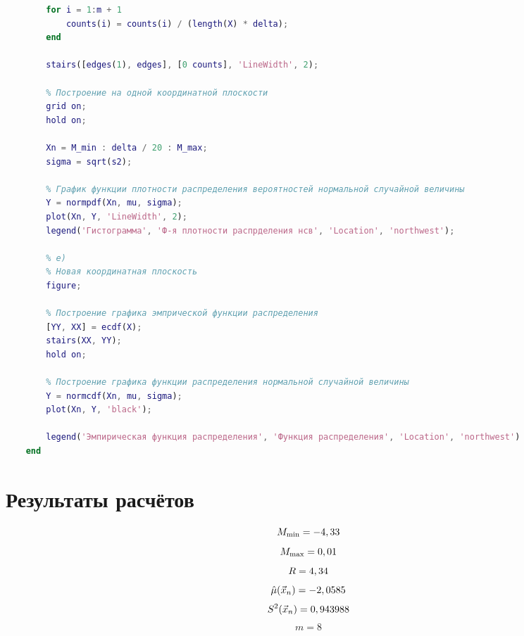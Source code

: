 \documentclass[12pt]{report}
\begin{document}
\begin{lstlisting}[language=Matlab]
		% д) Построение гистограммы
		for i = 1:m + 1
			counts(i) = counts(i) / (length(X) * delta);
		end
	
		stairs([edges(1), edges], [0 counts], 'LineWidth', 2);
	
		% Построение на одной координатной плоскости
		grid on;
		hold on;
	
		Xn = M_min : delta / 20 : M_max;
		sigma = sqrt(s2);
	
		% График функции плотности распределения вероятностей нормальной случайной величины
		Y = normpdf(Xn, mu, sigma);
		plot(Xn, Y, 'LineWidth', 2);
		legend('Гистограмма', 'Ф-я плотности распрделения нсв', 'Location', 'northwest');
		
		% е) 
		% Новая координатная плоскость
		figure;
		
		% Построение графика эмпрической функции распределения
		[YY, XX] = ecdf(X);
		stairs(XX, YY);
		hold on;
		
		% Построение графика функции распределения нормальной случайной величины
		Y = normcdf(Xn, mu, sigma);
		plot(Xn, Y, 'black');
		
		legend('Эмпирическая функция распределения', 'Функция распределения', 'Location', 'northwest')
	end	
\end{lstlisting}

\section*{Результаты расчётов}

\begin{equation*}
    M_{\min} = -4,33 \\
\end{equation*}
\begin{equation*}
    M_{\max} = 0,01 \\
\end{equation*}
\begin{equation*}
    R = 4,34 \\
\end{equation*}
\begin{equation*}
    \hat\mu(\vec x_n) = -2,0585 \\
\end{equation*}
\begin{equation*}
    S^2(\vec x_n) = 0,943988 \\
\end{equation*}
\begin{equation*}
    m = 8
\end{equation*}
\end{document}
